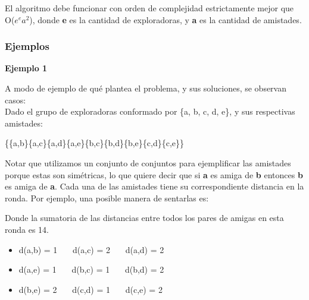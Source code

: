 \documentclass[11pt]{article}
\begin{document}
El algoritmo debe funcionar con orden de complejidad estrictamente mejor que O($e^{e}  a^{2}$), donde \textbf{e} es la cantidad de exploradoras, y \textbf{a} es la cantidad de amistades.

\subsubsection{Ejemplos}

\vspace{2mm}
\textbf{Ejemplo 1}
\vspace{2mm}

A modo de ejemplo de qué plantea el problema, y sus soluciones, se observan casos:\\ 

Dado el grupo de exploradoras conformado por \{a, b, c, d, e\}, y sus respectivas amistades: 

\begin{center}
\{\{a,b\}\{a,c\}\{a,d\}\{a,e\}\{b,c\}\{b,d\}\{b,e\}\{c,d\}\{c,e\}\}
\end{center}

Notar que utilizamos un conjunto de conjuntos para ejemplificar las amistades porque estas son simétricas, lo que quiere
decir que si \textbf{a} es amiga de \textbf{b} entonces \textbf{b} es amiga de \textbf{a}. Cada una de las
amistades tiene su correspondiente distancia en la ronda. Por ejemplo, una posible manera de sentarlas es:

\begin{figure}[H]
\begin{center}
\end{center}
\end{figure}

Donde la sumatoria de las distancias entre todos los pares de amigas en esta ronda es 14.
\begin{itemize}
  \item d(a,b) = 1   \ \ \ \inlineitem d(a,c) = 2 \ \ \ \inlineitem d(a,d) = 2
  \item d(a,e) = 1   \ \ \ \inlineitem d(b,c) = 1 \ \ \ \inlineitem d(b,d) = 2
  \item d(b,e) = 2   \ \ \ \inlineitem d(c,d) = 1 \ \ \ \inlineitem d(c,e) = 2
\end{itemize}
\end{document}
